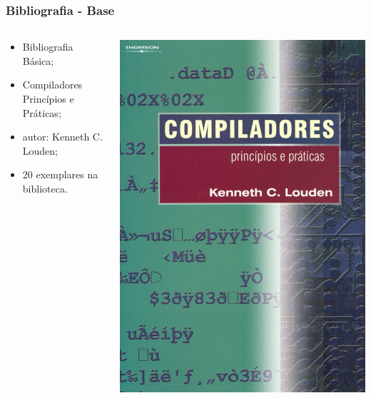 \documentclass[table]{beamer}
\begin{document}
\begin{frame}
   \frametitle{Bibliografia - Base}
   \begin{columns}
      \begin{column}{0.5\textwidth}
         \begin{itemize}
	    \item Bibliografia Básica;
	    \item Compiladores Princípios e Práticas;
	    \item autor: Kenneth C. Louden;
	    \item 20 exemplares na biblioteca.
	 \end{itemize}
      \end{column}
      \begin{column}{0.5\textwidth}
      \includegraphics[scale=1.0]{figuras/livro_base.jpg}
      \end{column}
   \end{columns}
\end{frame}
\end{document}
